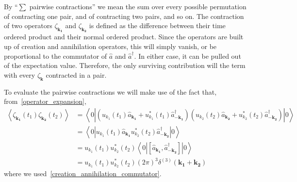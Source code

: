 By ``$\sum$ pairwise contractions'' we mean the sum over every possible permutation of contracting one pair,
and of contracting two pairs, and so on.
The contraction of two operators $\zeta_{\mathbf{k_1}}$ and $\zeta_{\mathbf{k_2}}$
is defined as the difference between their time ordered product and their normal ordered product.
Since the operators are built up of creation and annihilation operators, this will simply
vanish, or
be proportional to the commutator of $\hat{a}$ and $\hat{a}^{\dagger}$.
In either case, it can be pulled out of the expectation value.
Therefore, the only surviving contribution will the term with every $\zeta_{\mathbf{k}}$
contracted in a pair.


To evaluate the pairwise contractions we will make use of the fact that, from~\eqref{operator_expansion},
\begin{align}
    \left<\zeta_{\mathbf{k_1}}(t_1)\zeta_{\mathbf{k_2}}(t_2)\right>
    &= \left<0\left|
            \left(u_{k_1}(t_1)\hat{a}_\mathbf{k_1} +
            u^*_{k_1}(t_1)\hat{a}^{\dagger}_{-\mathbf{k_1}}\right)
            \left(u_{k_2}(t_2)\hat{a}_\mathbf{k_2} +
            u^*_{k_2}(t_2)\hat{a}^{\dagger}_{-\mathbf{k_2}}\right)
        \right|0\right>\\
    &= \left<0\left|
            u_{k_1}(t_1)\hat{a}_\mathbf{k_1}
            u^*_{k_2}(t_2)\hat{a}^{\dagger}_{-\mathbf{k_2}}
        \right|0\right>\\
    &= u_{k_1}(t_1)u^*_{k_2}(t_2)\left<0\left|
            \left[\hat{a}_\mathbf{k_1},
            \hat{a}^{\dagger}_{-\mathbf{k_2}}\right]
        \right|0\right>\\
    &= u_{k_1}(t_1)u^*_{k_2}(t_2)(2\pi)^3\delta^{(3)}(\mathbf{k_1}+\mathbf{k_2})
\end{align}
where we used~\eqref{creation_annihilation_commutator}.


